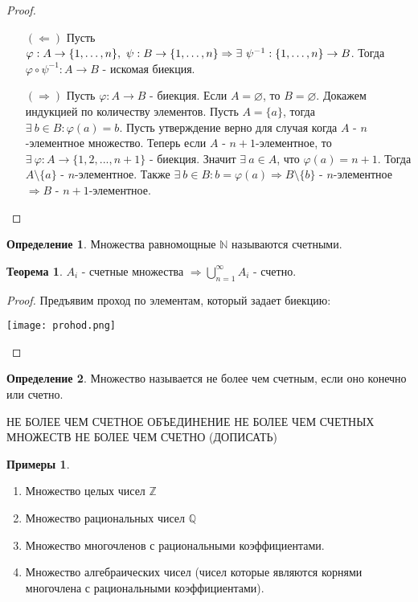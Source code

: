 \documentclass[a4paper, 12pt]{article}
\newcommand{\Z}{\mathbb{Z}}
\newcommand{\N}{\mathbb{N}}
\newcommand{\Q}{\mathbb{Q}}
\renewcommand{\phi}{\varphi}
\renewcommand{\emptyset}{\varnothing}
\newcommand\tab[1][.5cm]{\hspace*{#1}}
\theoremstyle{definition}
\newtheorem*{definition}{Определение}
\newtheorem*{theorem}{Теорема}
\newtheorem*{examples}{Примеры}
\begin{document}
        \begin{proof}
            \begin{itemize}
                \item[$(\Leftarrow)$] Пусть $\phi:A\to \{1,\dots, n\}, \ \psi:B\to \{1,\dots, n\}\\
                \Rightarrow \exists \ \psi^{-1}:\{1,\dots, n\}\to B$. Тогда $\phi \circ \psi^{-1}:A\to B$ - искомая биекция.
                \item[$(\Rightarrow)$] Пусть $\phi:A\to B$ - биекция. Если $A=\emptyset$, то $B=\emptyset$. Докажем индукцией по количеству элементов. Пусть $A=\{a\}$, тогда $\exists \ b\in B: \phi(a)=b$. Пусть утверждение верно для случая когда $A$ - $n$-элементное множество. Теперь если $A$ - $n+1$-элементное, то $\exists \ \phi:A\to \{1,2,...,n+1\}$ - биекция. Значит $\exists \ a\in A$, что $\phi(a)=n+1$. Тогда $A\setminus\{a\}$ - $n$-элементное. Также $\exists \ b\in B: b=\phi(a) \Rightarrow B\setminus\{b\}$ - $n$-элементное $\Rightarrow  B$ - $n+1$-элементное.
            \end{itemize}
        \end{proof}
        \begin{definition}
            Множества равномощные $\N$ называются счетными.
        \end{definition}
        \begin{theorem}
            $A_i$ - счетные множества $\Rightarrow \bigcup\limits_{n=1}^{\infty}A_i$ - счетно.
        \end{theorem}
        \begin{proof}
            Предъявим проход по элементам, который задает биекцию:
            \begin{center}
                \texttt{[image: prohod.png]}
            \end{center}
        \end{proof}
        \begin{definition}
            Множество называется не более чем счетным, если оно конечно или счетно.
        \end{definition}
        НЕ БОЛЕЕ ЧЕМ СЧЕТНОЕ ОБЪЕДИНЕНИЕ НЕ БОЛЕЕ ЧЕМ СЧЕТНЫХ МНОЖЕСТВ НЕ БОЛЕЕ ЧЕМ СЧЕТНО (ДОПИСАТЬ) 
        \begin{examples}
            \begin{enumerate}\tab
                \item Множество целых чисел $\Z$
                \item Множество рациональных чисел $\Q$
                \item Множество многочленов с рациональными коэффициентами.
                \item Множество алгебраических чисел (чисел которые являются корнями многочлена с рациональными коэффициентами).
            \end{enumerate}
        \end{examples}
\end{document}
